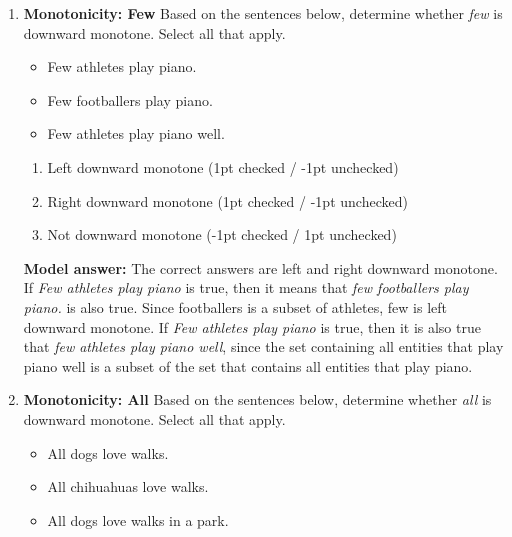 \documentclass[a4,11pt]{article}
\begin{document}
\begin{enumerate}[leftmargin = 12pt]
{\bf Model answer:}  The correct answer is \textit{No dog likes to sleep on the ground}. A right downward monotone determiner is a determiner such that in a sentence of the form D X Y it entails D X Y', where Y' is a subset of Y. \textit{Sleep on the ground} is a subset of \textit{sleep}. The sentence \textit{No poodle likes to sleep} shows that \textit{no} is also left downward monotone, because a poodle is a subset of dogs.

\item {\bf Monotonicity: Few} Based on the sentences below, determine whether \textit{few} is downward monotone. Select all that apply. 

\begin{itemize}[noitemsep]
\item Few athletes play piano.
\item Few footballers play piano.
\item Few athletes play piano well.
\end{itemize}

      \begin{enumerate}[noitemsep]
        \item Left downward monotone (1pt checked / -1pt unchecked)
        \item Right downward monotone (1pt checked / -1pt unchecked)
        \item Not downward monotone (-1pt checked / 1pt unchecked)
	\end{enumerate}	

{\bf Model answer:} The correct answers are left and right downward monotone. If \textit{Few athletes play piano} is true, then it means that \textit{few footballers play piano.} is also true. Since footballers is a subset of athletes, few is left downward monotone. If \textit{Few athletes play piano} is true, then it is also true that \textit{few athletes play piano well}, since the set containing all entities that play piano well is a subset of  the set that contains all entities that play piano.


\item {\bf Monotonicity: All} Based on the sentences below, determine whether \textit{all} is downward monotone. Select all that apply. 
\begin{itemize}[noitemsep]
\item All dogs love walks.
\item All chihuahuas love walks.
\item All dogs love walks in a park.
\end{itemize}



\end{enumerate}
\end{document}
